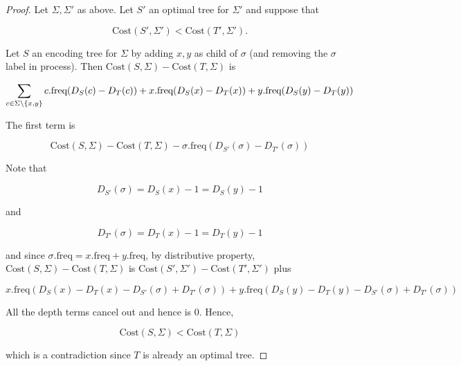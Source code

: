 \begin{proof}
    Let $\Sigma, \Sigma'$ as above. Let $S'$ an optimal tree for $\Sigma'$ and suppose that 

    \[
        \text{Cost}(S',\Sigma')<\text{Cost}(T',\Sigma'). 
    \]

    Let $S$ an encoding tree for $\Sigma$ by adding $x, y$ as child of $\sigma$ (and removing the $\sigma$ label in process). 
    Then $\text{Cost}(S,\Sigma)-\text{Cost}(T,\Sigma)$ is 

    \[
        \sum_{c \in \Sigma \setminus \cbr{x, y}} c.\text{freq}(D_S(c)-D_T(c)) + x.\text{freq}(D_S(x)-D_T(x))+y.\text{freq}(D_S(y)-D_T(y))
    \]

    The first term is 

    \[
        \text{Cost}(S,\Sigma)-\text{Cost}(T,\Sigma) - \sigma.\text{freq}(D_{S'}(\sigma) - D_{T'}(\sigma)) 
    \]

    Note that 

    \[
        D_{S'}(\sigma) = D_{S}(x) - 1 = D_{S}(y) - 1
    \]

    and 

    \[
        D_{T'}(\sigma) = D_{T}(x) - 1 = D_{T}(y) - 1
    \]

    and since $\sigma.\text{freq} = x.\text{freq} + y.\text{freq}$, by distributive property, $\text{Cost}(S,\Sigma)-\text{Cost}(T,\Sigma)$ is $\text{Cost}(S',\Sigma')-\text{Cost}(T',\Sigma')$ plus

    \[
        x.\text{freq}(D_S(x)-D_T(x) - D_{S'}(\sigma) + D_{T'}(\sigma)) +y.\text{freq}(D_S(y)-D_T(y)-D_{S'}(\sigma) + D_{T'}(\sigma))
    \]

    All the depth terms cancel out and hence is $0$. Hence, 

    \[
        \text{Cost}(S,\Sigma)< \text{Cost}(T,\Sigma)
    \]

    which is a contradiction since $T$ is already an optimal tree. 
\end{proof}